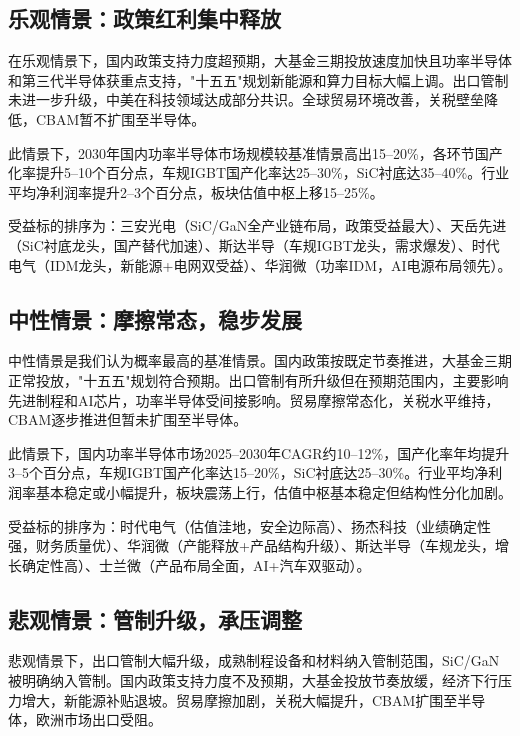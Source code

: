 \color{black}

\subsection{乐观情景：政策红利集中释放}

在乐观情景下，国内政策支持力度超预期，大基金三期投放速度加快且功率半导体和第三代半导体获重点支持，"十五五"规划新能源和算力目标大幅上调。出口管制未进一步升级，中美在科技领域达成部分共识。全球贸易环境改善，关税壁垒降低，CBAM暂不扩围至半导体。

此情景下，2030年国内功率半导体市场规模较基准情景高出15--20\%，各环节国产化率提升5--10个百分点，车规IGBT国产化率达25--30\%，SiC衬底达35--40\%。行业平均净利润率提升2--3个百分点，板块估值中枢上移15--25\%。

受益标的排序为：三安光电（SiC/GaN全产业链布局，政策受益最大）、天岳先进（SiC衬底龙头，国产替代加速）、斯达半导（车规IGBT龙头，需求爆发）、时代电气（IDM龙头，新能源+电网双受益）、华润微（功率IDM，AI电源布局领先）。

\subsection{中性情景：摩擦常态，稳步发展}

中性情景是我们认为概率最高的基准情景。国内政策按既定节奏推进，大基金三期正常投放，"十五五"规划符合预期。出口管制有所升级但在预期范围内，主要影响先进制程和AI芯片，功率半导体受间接影响。贸易摩擦常态化，关税水平维持，CBAM逐步推进但暂未扩围至半导体。

此情景下，国内功率半导体市场2025--2030年CAGR约10--12\%，国产化率年均提升3--5个百分点，车规IGBT国产化率达15--20\%，SiC衬底达25--30\%。行业平均净利润率基本稳定或小幅提升，板块震荡上行，估值中枢基本稳定但结构性分化加剧。

受益标的排序为：时代电气（估值洼地，安全边际高）、扬杰科技（业绩确定性强，财务质量优）、华润微（产能释放+产品结构升级）、斯达半导（车规龙头，增长确定性高）、士兰微（产品布局全面，AI+汽车双驱动）。

\subsection{悲观情景：管制升级，承压调整}

悲观情景下，出口管制大幅升级，成熟制程设备和材料纳入管制范围，SiC/GaN被明确纳入管制。国内政策支持力度不及预期，大基金投放节奏放缓，经济下行压力增大，新能源补贴退坡。贸易摩擦加剧，关税大幅提升，CBAM扩围至半导体，欧洲市场出口受阻。

